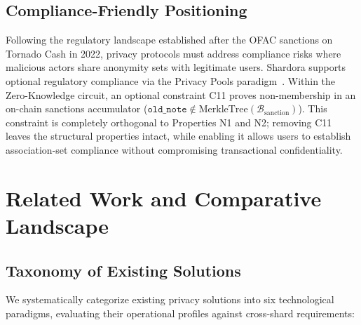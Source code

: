 \documentclass[journal,10pt,twocolumn]{IEEEtran}
\theoremstyle{definition}
\theoremstyle{remark}
\begin{document}
\subsection{Compliance-Friendly Positioning}
Following the regulatory landscape established after the OFAC sanctions on Tornado Cash in 2022, privacy protocols must address compliance risks where malicious actors share anonymity sets with legitimate users. Shardora supports optional regulatory compliance via the Privacy Pools paradigm~\cite{buterin2023blockchain}. Within the Zero-Knowledge circuit, an optional constraint C11 proves non-membership in an on-chain sanctions accumulator ($\mathtt{old\_note} \notin \text{MerkleTree}(\mathcal{B}_{\text{sanction}})$). This constraint is completely orthogonal to Properties N1 and N2; removing C11 leaves the structural properties intact, while enabling it allows users to establish association-set compliance without compromising transactional confidentiality.

\section{Related Work and Comparative Landscape}

\subsection{Taxonomy of Existing Solutions}
We systematically categorize existing privacy solutions into six technological paradigms, evaluating their operational profiles against cross-shard requirements:
\end{document}
